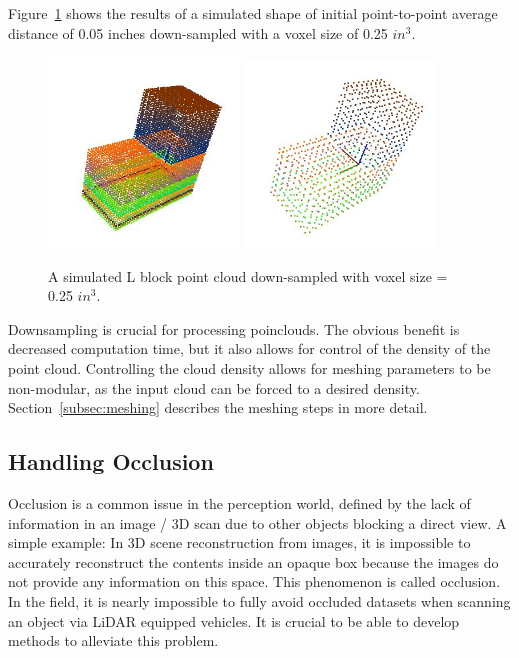 \documentclass[12pt]{drexelthesis}
\let\Oldsubsection\subsection
\renewcommand{\subsection}{\FloatBarrier\Oldsubsection}
\begin{document}
Figure~\ref{intro:downsampling} shows the results of a simulated shape of initial point-to-point average distance of 0.05 inches down-sampled with a voxel size of 0.25 $in^{3}$.

\begin{figure}[!ht]
	\centering
		\includegraphics[width=2in]{l_block_pt_cloud} \includegraphics[width=2in]{l_block_pt_cloudDOWNSAMPLE025.jpg}
	\caption[Effects of down-sampling on simulated point cloud objects]{\centering A simulated L block point cloud down-sampled with voxel size = 0.25 $in^{3}$.}
	\label{intro:downsampling}
\end{figure}

Downsampling is crucial for processing poinclouds. The obvious benefit is decreased computation time, but it also allows for control of the density of the point cloud. Controlling the cloud density allows for meshing parameters to be non-modular, as the input cloud can be forced to a desired density. Section~\ref{subsec:meshing} describes the meshing steps in more detail.

\subsection{Handling Occlusion} 
Occlusion is a common issue in the perception world, defined by the lack of information in an image / 3D scan due to other objects blocking a direct view. A simple example: In 3D scene reconstruction from images, it is impossible to accurately reconstruct the contents inside an opaque box because the images do not provide any information on this space. This phenomenon is called occlusion. In the field, it is nearly impossible to fully avoid occluded datasets when scanning an object via LiDAR equipped vehicles. It is crucial to be able to develop methods to alleviate this problem.
\end{document}

